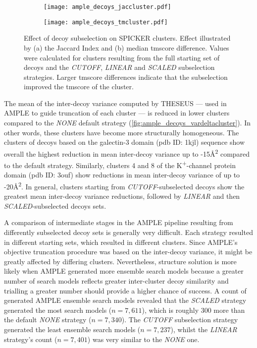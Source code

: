 \begin{figure}[H]
    \centering
    \begin{subfigure}[b]{\textwidth}
        \texttt{[image: ample\_decoys\_jaccluster.pdf]}
        \caption{}
        \label{fig:ample_decoys_jaccluster}
    \end{subfigure}
\end{figure}

\begin{figure}[H]\ContinuedFloat
    \begin{subfigure}[b]{\textwidth}
        \texttt{[image: ample\_decoys\_tmcluster.pdf]}
        \caption{}
        \label{fig:ample_decoys_tmcluster}
    \end{subfigure}
    \caption[Effect of decoy subselection on SPICKER clusters]{Effect of decoy subselection on SPICKER clusters. Effect illustrated by (a) the Jaccard Index and (b) median \gls{tmscore} difference. Values were calculated for clusters resulting from the full starting set of decoys and the \textit{CUTOFF}, \textit{LINEAR} and \textit{SCALED} subselection strategies. Larger \gls{tmscore} differences indicate that the subselection improved the \gls{tmscore} of the cluster.}
\end{figure}

The mean of the inter-decoy variance computed by THESEUS --- used in AMPLE to guide truncation of each cluster --- is reduced in lower clusters compared to the \textit{NONE} default strategy (\cref{fig:ample_decoys_vardeltacluster}). In other words, these clusters have become more structurally homogeneous. The clusters of decoys based on the galectin-3 domain (\gls{pdb} ID: 1kjl) sequence show overall the highest reduction in mean inter-decoy variance up to -15\AA\textsuperscript{2} compared to the default strategy. Similarly, clusters 4 and 8 of the K\textsuperscript{+}-channel protein domain (\gls{pdb} ID: 3ouf) show reductions in mean inter-decoy variance of up to -20\AA\textsuperscript{2}. In general, clusters starting from \textit{CUTOFF}-subselected decoys show the greatest mean inter-decoy variance reductions, followed by \textit{LINEAR} and then \textit{SCALED}-subselected decoys sets.

A comparison of intermediate stages in the AMPLE pipeline resulting from differently subselected decoy sets is generally very difficult. Each strategy resulted in different starting sets, which resulted in different clusters. Since AMPLE's objective truncation procedure was based on the inter-decoy variance, it might be greatly affected by differing clusters. Nevertheless, structure solution is more likely when AMPLE generated more ensemble search models because a greater number of search models reflects greater inter-cluster decoy similarity and trialling a greater number should provide a higher chance of success. A count of generated AMPLE ensemble search models revealed that the \textit{SCALED} strategy generated the most search models ($n=7,611$), which is roughly 300 more than the default \textit{NONE} strategy ($n=7,340$). The \textit{CUTOFF} subselection strategy generated the least ensemble search models ($n=7,237$), whilst the \textit{LINEAR} strategy's count ($n=7,401$) was very similar to the \textit{NONE} one.

